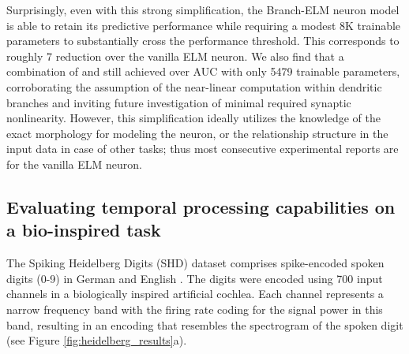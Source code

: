\documentclass{article} \usepackage{iclr2024_doc_style,times}
\begin{document}
Surprisingly, even with this strong simplification, the  \textcolor{lightblueVar}{Branch-ELM} neuron model is able to retain its predictive performance while requiring a modest 8K trainable parameters to substantially cross the performance threshold. This corresponds to roughly 7 reduction over the vanilla  \textcolor{blueVar}{ELM} neuron. 
We also find  that a combination of  and  still achieved over  AUC with only 5479 trainable parameters, corroborating the assumption of the near-linear computation within dendritic branches and inviting future investigation of minimal required synaptic nonlinearity.  However, this simplification ideally utilizes the knowledge of the exact morphology for modeling the neuron, or the relationship structure in the input data in case of other tasks; thus most consecutive experimental reports are for the vanilla \textcolor{blueVar}{ELM} neuron.

\subsection{Evaluating temporal processing capabilities on a bio-inspired task}
\label{heidelberg_experiments}

The Spiking Heidelberg Digits (SHD) dataset comprises spike-encoded spoken digits (0-9) in German and English \cite{cramer2020heidelberg}. The digits were encoded using 700 input channels in a biologically inspired artificial cochlea. Each channel represents a narrow frequency band with the firing rate coding for the signal power in this band, resulting in an encoding that resembles the spectrogram of the spoken digit (see Figure \ref{fig:heidelberg_results}a). 
\end{document}
